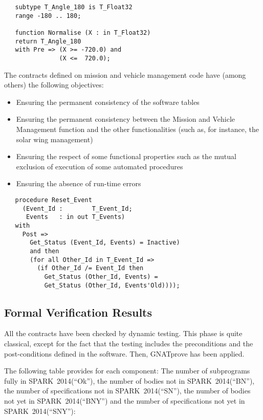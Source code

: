 \documentclass[10pt,a4paper,twocolumn]{article}
\newcommand{\gnatprove}{GNATprove\xspace}
\newcommand{\newspark}{SPARK~2014\xspace}
\begin{document}
\begin{lstlisting}
   subtype T_Angle_180 is T_Float32
   range -180 .. 180;

   function Normalise (X : in T_Float32)
   return T_Angle_180
   with Pre => (X >= -720.0) and
               (X <=  720.0);
\end{lstlisting}

The contracts defined on mission and vehicle management code have (among others) the following objectives:

\begin{itemize}
\item Ensuring the permanent consistency of the software tables
\item Ensuring the permanent consistency between the Mission and Vehicle Management function and the other functionalities (such as, for instance, the solar wing management)
\item Ensuring the respect of some functional properties such as the mutual exclusion of execution of some automated procedures
\item Ensuring the absence of run-time errors
\end{itemize}

\begin{lstlisting}
   procedure Reset_Event
     (Event_Id :        T_Event_Id;
      Events   : in out T_Events)
   with
     Post =>
       Get_Status (Event_Id, Events) = Inactive)
       and then
       (for all Other_Id in T_Event_Id =>
         (if Other_Id /= Event_Id then
           Get_Status (Other_Id, Events) =
           Get_Status (Other_Id, Events'Old))));
\end{lstlisting}

\subsection{Formal Verification Results}

All the contracts have been checked by dynamic testing. This phase is quite classical, except for the fact that the testing includes the preconditions and the post-conditions defined in the software. Then, \gnatprove has been applied.

The following table provides for each component: 
The number of subprograms fully in \newspark (``Ok''), 
the number of bodies not in \newspark (``BN''),
the number of specifications not in \newspark (``SN''),
the number of bodies not yet in \newspark (``BNY'') and 
the number of specifications not yet in \newspark (``SNY''):
\end{document}
